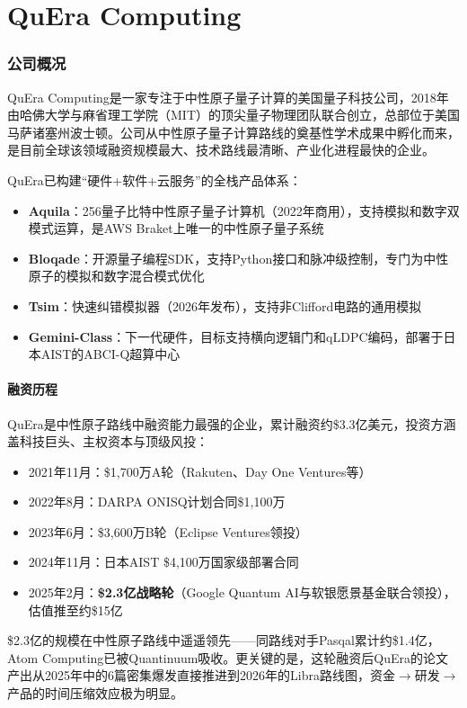 \documentclass[11pt,a4paper]{ctexart}
\begin{document}
\part{QuEra Computing}

\section{公司概况}

QuEra Computing是一家专注于中性原子量子计算的美国量子科技公司，2018年由哈佛大学与麻省理工学院（MIT）的顶尖量子物理团队联合创立，总部位于美国马萨诸塞州波士顿。公司从中性原子量子计算路线的奠基性学术成果中孵化而来，是目前全球该领域融资规模最大、技术路线最清晰、产业化进程最快的企业。

QuEra已构建``硬件+软件+云服务''的全栈产品体系：
\begin{itemize}
\item \textbf{Aquila}：256量子比特中性原子量子计算机（2022年商用），支持模拟和数字双模式运算，是AWS Braket上唯一的中性原子量子系统
\item \textbf{Bloqade}：开源量子编程SDK，支持Python接口和脉冲级控制，专门为中性原子的模拟和数字混合模式优化
\item \textbf{Tsim}：快速纠错模拟器（2026年发布），支持非Clifford电路的通用模拟
\item \textbf{Gemini-Class}：下一代硬件，目标支持横向逻辑门和qLDPC编码，部署于日本AIST的ABCI-Q超算中心
\end{itemize}

\subsection{融资历程}

QuEra是中性原子路线中融资能力最强的企业，累计融资约\$3.3亿美元，投资方涵盖科技巨头、主权资本与顶级风投：
\begin{itemize}
\item 2021年11月：\$1,700万A轮（Rakuten、Day One Ventures等）
\item 2022年8月：DARPA ONISQ计划合同\$1,100万
\item 2023年6月：\$3,600万B轮（Eclipse Ventures领投）
\item 2024年11月：日本AIST \$4,100万国家级部署合同
\item 2025年2月：\textbf{\$2.3亿战略轮}（Google Quantum AI与软银愿景基金联合领投），估值推至约\$15亿
\end{itemize}

\$2.3亿的规模在中性原子路线中遥遥领先——同路线对手Pasqal累计约\$1.4亿，Atom Computing已被Quantinuum吸收。更关键的是，这轮融资后QuEra的论文产出从2025年中的6篇密集爆发直接推进到2026年的Libra路线图，资金$\rightarrow$研发$\rightarrow$产品的时间压缩效应极为明显。
\end{document}
